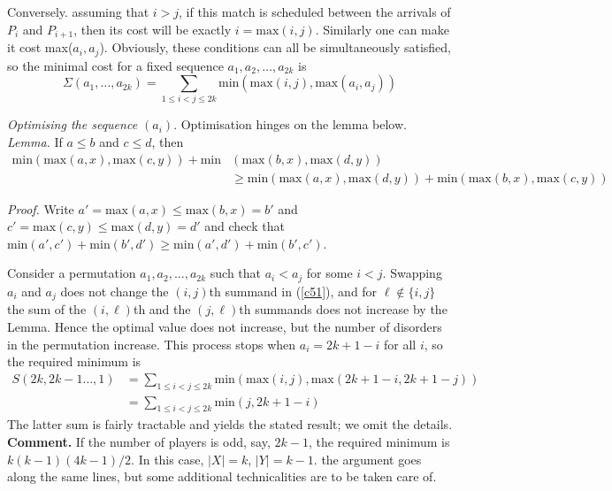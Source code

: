 \documentclass[a4paper, 12pt]{article}
\begin{document}
\begin{enumerate}
Conversely. assuming that $i > j$, if this match is scheduled between the arrivals of $P_i$ and $P_{i+1}$, then its cost will be exactly $i = \textrm{max}(i, j)$. Similarly one can make it cost max($a_i, a_j$). Obviously, these conditions can all be simultaneously satisfied, so the minimal cost for a fixed sequence $a_1, a_2, \dots, a_{2k}$ is
\begin{equation} \label{c51}
    \Sigma(a_1, \dots, a_{2k}) = \sum_{1 \leq i < j \leq 2k} \textrm{min}(\textrm{max}(i, j), \textrm{max}(a_i, a_j))
\end{equation}

\textit{Optimising the sequence $(a_i)$}. Optimisation hinges on the lemma below. \\

\textit{Lemma. } If $a \leq b$ and $c \leq d$, then
\begin{align*}
    \textrm{min}(\textrm{max}(a, x), \textrm{max}(c, y)) +\textrm{min}&(\textrm{max}(b, x), \textrm{max}(d, y))  \\
    &\geq \textrm{min}(\textrm{max}(a, x), \textrm{max}(d, y)) + \textrm{min}(\textrm{max}(b, x), \textrm{max}(c, y)) 
\end{align*}

\textit{Proof. } Write $a' = \textrm{max}(a, x) \leq \textrm{max}(b, x) = b'$ and $c'  = \textrm{max}(c, y) \leq \textrm{max}(d, y) = d' $ and check that $\textrm{min}(a', c') + \textrm{min}(b', d') \geq \textrm{min}(a', d') + \textrm{min}(b', c') $.

Consider a permutation $a_1, a_2, \dots, a_{2k}$ such that $a_i < a_j$ for some $i < j$. Swapping $a_i$ and $a_j$ does not change the $(i, j)$th summand in (\ref{c51}), and for $\ell \not \in \{i, j\}$ the sum of the $(i, \ell)$th and the $(j, \ell)$th summands does not increase by the Lemma. Hence the optimal value does not increase, but the number of disorders in the permutation increase. This process stops when $a_i = 2k+1-i$ for all $i$, so the required minimum is
\begin{align*}
    S(2k, 2k-1 \dots, 1) &= \sum_{1 \leq i < j \leq 2k} \textrm{min} (\textrm{max} (i, j), \textrm{max} (2k+1-i, 2k+1-j)) \\
    &= \sum_{1 \leq i < j \leq 2k} \textrm{min} (j, 2k+1-i)
\end{align*}
The latter sum is fairly tractable and yields the stated result; we omit the details. \\

\textbf{Comment. } If the number of players is odd, say, $2k-1$, the required minimum is $k(k-1)(4k-1)/2$. In this case, $|X| = k$, $|Y| = k-1$. the argument goes along the same lines, but some additional technicalities are to be taken care of.

\vspace{6mm}


    

\end{enumerate}
\end{document}
